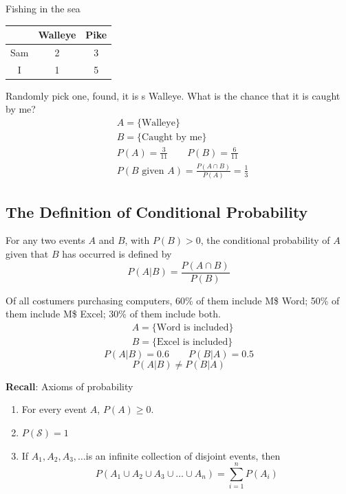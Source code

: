 \begin{exmp}
Fishing in the sea
\begin{center}
\begin{tabular}{c|c|c}
\hline
 & Walleye & Pike\\
 \hline
 Sam & 2 &3\\
 \hline
 I & 1 &5\\
 \hline
\end{tabular}
\end{center}

Randomly pick one, found, it is s Walleye. What is the chance that it is caught by me?
\begin{align*}
&A=\{\text{Walleye}\}\\
&B=\{\text{Caught by me}\}\\
&P(A)=\frac{3}{11} \qquad P(B)=\frac{6}{11}\\
&P(B\text{ given }A)=\frac{P(A \cap B)}{P(A)}=\boxed{\frac{1}{3}}
\end{align*}
\end{exmp}

\subsection{The Definition of Conditional Probability}
\begin{defn}
For any two events $A$ and $B$, with $P(B)>0$, the conditional probability of $A$ given that $B$ has occurred is defined by
\[P(A|B)=\frac{P(A \cap B)}{P(B)}\]
\end{defn} 

\begin{exmp}
Of all costumers purchasing computers, 60\% of them include M\$ Word; 50\% of them include M\$ Excel; 30\% of them include both.
\begin{align*}
&A=\{\text{Word is included}\} 	\\
&B=\{\text{Excel is included}\}	
\end{align*}
\[P(A|B)=0.6 \qquad P(B|A)=0.5\] 
\[P(A|B)\neq P(B|A)\]
\end{exmp}

\textbf{Recall}:
Axioms of probability

\begin{enumerate}
\item  For every event $A$, $P(A)\geq 0$.
\item  $P(\mathcal{S})=1$
\item
If $A_1, A_2,A_3,\dots$is an infinite collection of disjoint events, then 
\[  P(A_1 \cup A_2\cup A_3 \cup \dots\cup A_n)=\sum_{i=1}^{n}P(A_i)	\]
\end{enumerate}

